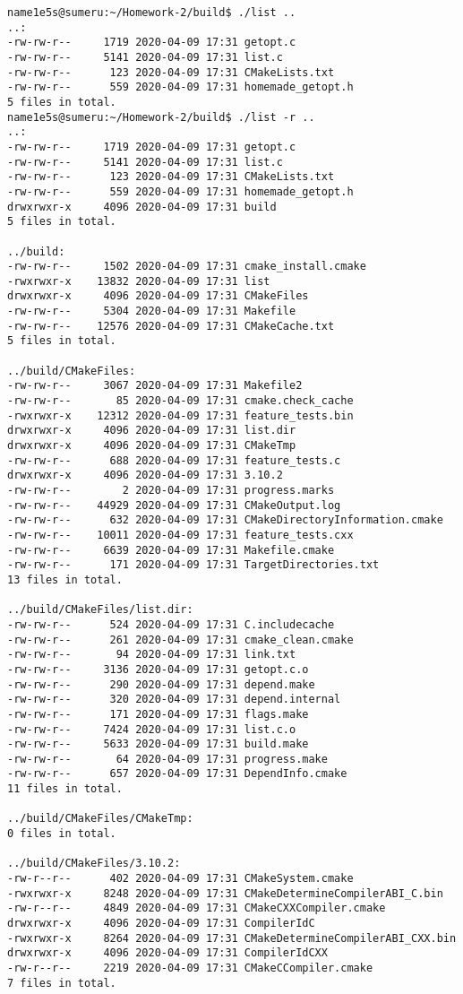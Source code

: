 \documentclass[blue,normal,cn]{elegantnote}
\begin{document}
\begin{lstlisting}
name1e5s@sumeru:~/Homework-2/build$ ./list ..
..:
-rw-rw-r--     1719 2020-04-09 17:31 getopt.c
-rw-rw-r--     5141 2020-04-09 17:31 list.c
-rw-rw-r--      123 2020-04-09 17:31 CMakeLists.txt
-rw-rw-r--      559 2020-04-09 17:31 homemade_getopt.h
5 files in total.
name1e5s@sumeru:~/Homework-2/build$ ./list -r ..
..:
-rw-rw-r--     1719 2020-04-09 17:31 getopt.c
-rw-rw-r--     5141 2020-04-09 17:31 list.c
-rw-rw-r--      123 2020-04-09 17:31 CMakeLists.txt
-rw-rw-r--      559 2020-04-09 17:31 homemade_getopt.h
drwxrwxr-x     4096 2020-04-09 17:31 build
5 files in total.

../build:
-rw-rw-r--     1502 2020-04-09 17:31 cmake_install.cmake
-rwxrwxr-x    13832 2020-04-09 17:31 list
drwxrwxr-x     4096 2020-04-09 17:31 CMakeFiles
-rw-rw-r--     5304 2020-04-09 17:31 Makefile
-rw-rw-r--    12576 2020-04-09 17:31 CMakeCache.txt
5 files in total.

../build/CMakeFiles:
-rw-rw-r--     3067 2020-04-09 17:31 Makefile2
-rw-rw-r--       85 2020-04-09 17:31 cmake.check_cache
-rwxrwxr-x    12312 2020-04-09 17:31 feature_tests.bin
drwxrwxr-x     4096 2020-04-09 17:31 list.dir
drwxrwxr-x     4096 2020-04-09 17:31 CMakeTmp
-rw-rw-r--      688 2020-04-09 17:31 feature_tests.c
drwxrwxr-x     4096 2020-04-09 17:31 3.10.2
-rw-rw-r--        2 2020-04-09 17:31 progress.marks
-rw-rw-r--    44929 2020-04-09 17:31 CMakeOutput.log
-rw-rw-r--      632 2020-04-09 17:31 CMakeDirectoryInformation.cmake
-rw-rw-r--    10011 2020-04-09 17:31 feature_tests.cxx
-rw-rw-r--     6639 2020-04-09 17:31 Makefile.cmake
-rw-rw-r--      171 2020-04-09 17:31 TargetDirectories.txt
13 files in total.

../build/CMakeFiles/list.dir:
-rw-rw-r--      524 2020-04-09 17:31 C.includecache
-rw-rw-r--      261 2020-04-09 17:31 cmake_clean.cmake
-rw-rw-r--       94 2020-04-09 17:31 link.txt
-rw-rw-r--     3136 2020-04-09 17:31 getopt.c.o
-rw-rw-r--      290 2020-04-09 17:31 depend.make
-rw-rw-r--      320 2020-04-09 17:31 depend.internal
-rw-rw-r--      171 2020-04-09 17:31 flags.make
-rw-rw-r--     7424 2020-04-09 17:31 list.c.o
-rw-rw-r--     5633 2020-04-09 17:31 build.make
-rw-rw-r--       64 2020-04-09 17:31 progress.make
-rw-rw-r--      657 2020-04-09 17:31 DependInfo.cmake
11 files in total.

../build/CMakeFiles/CMakeTmp:
0 files in total.

../build/CMakeFiles/3.10.2:
-rw-r--r--      402 2020-04-09 17:31 CMakeSystem.cmake
-rwxrwxr-x     8248 2020-04-09 17:31 CMakeDetermineCompilerABI_C.bin
-rw-r--r--     4849 2020-04-09 17:31 CMakeCXXCompiler.cmake
drwxrwxr-x     4096 2020-04-09 17:31 CompilerIdC
-rwxrwxr-x     8264 2020-04-09 17:31 CMakeDetermineCompilerABI_CXX.bin
drwxrwxr-x     4096 2020-04-09 17:31 CompilerIdCXX
-rw-r--r--     2219 2020-04-09 17:31 CMakeCCompiler.cmake
7 files in total.


\end{lstlisting}
\end{document}
